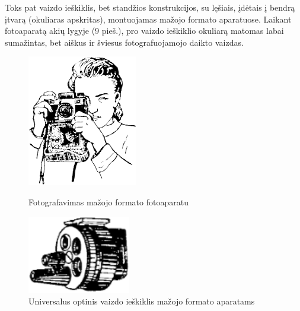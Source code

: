 \documentclass[12pt]{book}
\begin{document}
					Toks pat vaizdo ieškiklis, bet standžios konstrukcijos, su lęšiais, įdėtais į bendrą įtvarą (okuliaras apskritas), montuojamas mažojo formato aparatuose. Laikant fotoaparatą akių lygyje (9 pieš.), pro vaizdo ieškiklio okuliarą matomas labai sumažintas, bet aiškus ir šviesus fotografuojamojo daikto vaizdas.
					\begin{figure}[h]
						\centering
						\begin{minipage}[t]{0.4\textwidth}
							\includegraphics[width=\textwidth]{9-pav}
							\caption{Fotografavimas mažojo formato fotoaparatu}
							\label{fig:9}
						\end{minipage}
						\hfill
						\begin{minipage}[t]{0.4\textwidth}
							\includegraphics[width=0.4\textwidth]{10-pav}
							\caption{Universalus optinis vaizdo ieškiklis mažojo formato aparatams}
							\label{fig:10}
						\end{minipage}
					\end{figure}
\end{document}
